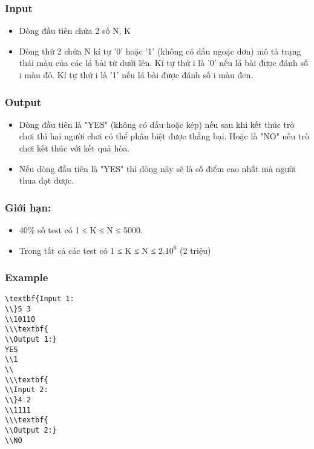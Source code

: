 \subsubsection{   Input  }
\begin{itemize}
	\item     Dòng đầu tiên chứa 2 số N, K   
	\item     Dòng thứ 2 chứa N kí tự '0' hoặc '1' (không có dấu ngoặc dơn) mô tả trạng thái màu của các lá bài từ dưới lên. Kí tự thứ i là '0' nếu lá bài được đánh số i màu đỏ. Kí tự thứ i là '1' nếu lá bài được đánh số i màu đen.   
\end{itemize}

\subsubsection{   Output  }
\begin{itemize}
	\item     Dòng đầu tiên là "YES" (không có dấu hoặc kép) nếu sau khi kết thúc trò chơi thì hai người chơi có thể phân biệt được thắng bại. Hoặc là "NO" nếu trò chơi kết thúc với kết quả hòa.   
	\item     Nếu dòng đầu tiên là "YES" thì dòng này sẽ là số điểm cao nhất mà người         thua        đạt được.   
\end{itemize}

\subsubsection{   Giới hạn:  }
\begin{itemize}
	\item     40\% số test có 1 ≤ K ≤ N ≤ 5000.   
	\item     Trong tất cả các test có 1 ≤ K ≤ N ≤ 2.$10^{6}$    (2 triệu)   
\end{itemize}
\begin{itemize}
\end{itemize}

\subsubsection{   Example  }
\begin{verbatim}
\textbf{Input 1:
\\}5 3
\\10110
\\\textbf{
\\Output 1:}
YES
\\1
\\
\\\textbf{
\\Input 2:
\\}4 2
\\1111
\\\textbf{
\\Output 2:}
\\NO\end{verbatim}

